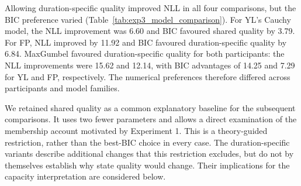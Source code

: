 Allowing duration-specific quality improved NLL in all four comparisons, but the BIC preference varied (Table~\ref{tab:exp3_model_comparison}). For YL's Cauchy model, the NLL improvement was 6.60 and BIC favoured shared quality by 3.79. For FP, NLL improved by 11.92 and BIC favoured duration-specific quality by 6.84. MaxGumbel favoured duration-specific quality for both participants: the NLL improvements were 15.62 and 12.14, with BIC advantages of 14.25 and 7.29 for YL and FP, respectively. The numerical preferences therefore differed across participants and model families.

We retained shared quality as a common explanatory baseline for the subsequent comparisons. It uses two fewer parameters and allows a direct examination of the membership account motivated by Experiment 1. This is a theory-guided restriction, rather than the best-BIC choice in every case. The duration-specific variants describe additional changes that this restriction excludes, but do not by themselves establish why state quality would change. Their implications for the capacity interpretation are considered below.

